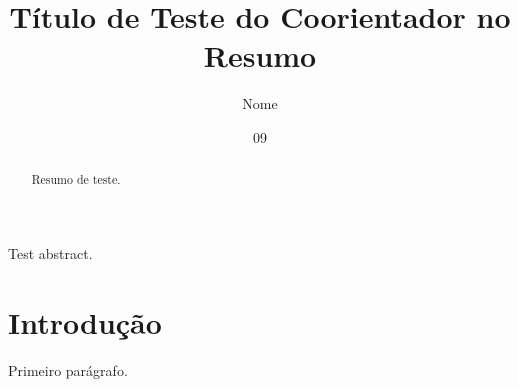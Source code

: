 \documentclass[dsc,coorientador]{ufrj}
\title{Título de Teste do Coorientador no Resumo}
\author{Nome}{de Teste}
\date{09}{2026}
\begin{document}
  \maketitle
  \frontmatter
  \begin{abstract}
    Resumo de teste.
  \end{abstract}
  \begin{foreignabstract}
    Test abstract.
  \end{foreignabstract}
  \tableofcontents
  \mainmatter
  \chapter{Introdução}
    Primeiro parágrafo.
\end{document}
